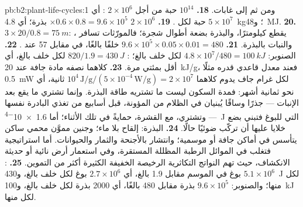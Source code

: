 \begin{solution}{pb:b2:plant-life-cycles:1}
ومن ثم إلى غابات.
\textbf{18.} $10^{14}$ حبة من أجل $2\times 10^{6}$ : أي $5\times
10^{7}$ حبة لكل .
\textbf{19.} $2\times 10^{6}$  $\times 0.6\times 0.8 = 9.6\times
10^{5}$ بذرة؛ أي \qty{4.8}{kg}؛ و\qty{48}{MJ}.
\textbf{20.} $3\times 20/0.8 = \qty{75}{m}$:  يقطع
كيلومترًا، والبذرة بضعة أطوال شجرة؛ فالمورّثات تسافر ،
والنبات بالبذرة.
\textbf{21.} $9.6\times 10^{5}\times 0.05\times 0.01 = 480$ خلفًا
بالغًا، في مقابل 57 عند .
\textbf{22.} الصنوبر: $4.8\times 10^{7}/480 = \qty{100}{kJ}$ لكل خلف
بالغ؛ : $820/1.9 = \qty{430}{J}$ لكل خلف بالغ، أي أقل بمئتي
مرة.
\textbf{23.} كلاهما نصفه مادة جافة عند \qty{20}{kJ/g}، فعند معدل
قاعدي قدره مثلًا \qty{0.5}{mW} لكل غرام جاف يدوم كلاهما $10^{4}\,
\text{J/g}/(5\times 10^{-4}\,\text{W/g}) = 2\times 10^{7}$ ثانية، أي
نحو ثمانية أشهر: فمدة السكون ليست ما تشتريه طاقة البذرة. وإنما
تشتري ما يقع بعد الإنبات --- جذرًا وساقًا يُبنيان في الظلام من
المؤونة، قبل أسابيع من تغذي البادرة نفسها --- وتشتري، مع القشرة،
حمايةً في تلك الأثناء؛ أما \qty{1.6e-4}{J} التي للبوغ فتبني بضع
خلايا عليها أن تركّب ضوئيًا حالًا.
\textbf{24.} البذرة: إلقاح بلا ماء؛ وجنين مموَّن محمي ساكن يتأسس في
أماكن جافة أو موسمية؛ وانتشار بالأجنحة والثمار والحيوانات. أما
استراتيجية  فتغلب في الموائل الرطبة المظللة المستقرة، وفي
استعمار أرض نائية أو حديثة الانكشاف، حيث تهم النواتج التكاثرية
الرخيصة الخفيفة الكثيرة أكثر من التموين.
\textbf{25.} : $5.1\times 10^{6}$ بوغ في الموسم مقابل 1.9 بالغ،
أي $2.7\times 10^{6}$ بوغ لكل خلف بالغ، و\qty{430}{J} لكل منها؛
والصنوبر: $9.6\times 10^{5}$ بذرة مقابل 480 بالغًا، أي \num{2000} بذرة
لكل خلف بالغ، و\qty{100}{kJ} لكل منها.
\end{solution}
